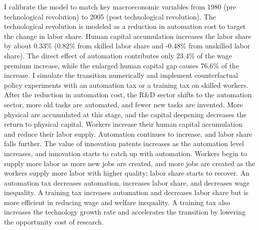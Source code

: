 \documentclass[12pt]{article}
\begin{document}
I calibrate the model to match key macroeconomic variables from 1980 (pre technological revolution) to 2005 (post technological revolution). The technological revolution is modeled as a reduction in automation cost to target the change in labor share. Human capital accumulation increases the labor share by about 0.33\% (0.82\% from skilled labor share and -0.48\% from unskilled labor share). The direct effect of automation contributes only 23.4\% of the wage premium increase, while the enlarged human capital gap causes 76.6\% of the increase. I simulate the transition numerically and implement counterfactual policy experiments with an automation tax or a training tax on skilled workers. After the reduction in automation cost, the R\&D sector shifts to the automation sector, more old tasks are automated, and fewer new tasks are invented. More physical are accumulated at this stage, and the capital deepening decreases the return to physical capital. Workers increase their human capital accumulation and reduce their labor supply. Automation continues to increase, and labor share falls further. The value of innovation patents increases as the automation level increases, and innovation starts to catch up with automation. Workers begin to supply more labor as more new jobs are created, and more jobs are created as the workers supply more labor with higher quality; labor share starts to recover. An automation tax decreases automation, increases labor share, and decreases wage inequality. A training tax increases automation and decreases labor share but is more efficient in reducing wage and welfare inequality. A training tax also increases the technology growth rate and accelerates the transition by lowering the opportunity cost of research. 
\end{document}
